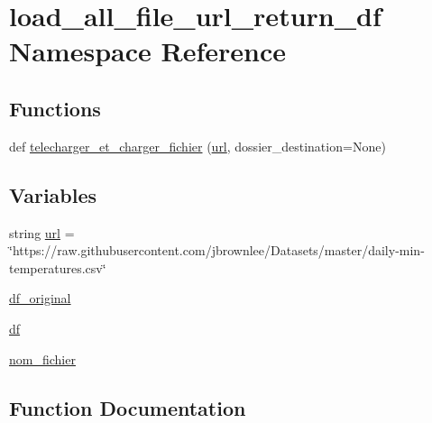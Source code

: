 \hypertarget{namespaceload__all__file__url__return__df}{}\section{load\+\_\+all\+\_\+file\+\_\+url\+\_\+return\+\_\+df Namespace Reference}
\label{namespaceload__all__file__url__return__df}
\subsection*{Functions}
\begin{DoxyCompactItemize}
\item 
def \hyperlink{namespaceload__all__file__url__return__df_a444d33e3bf671c50ce6cbe2a094d46f1}{telecharger\+\_\+et\+\_\+charger\+\_\+fichier} (\hyperlink{namespaceload__all__file__url__return__df_a244c87d4009157378422f3e580a8c001}{url}, dossier\+\_\+destination=None)
\end{DoxyCompactItemize}
\subsection*{Variables}
\begin{DoxyCompactItemize}
\item 
string \hyperlink{namespaceload__all__file__url__return__df_a244c87d4009157378422f3e580a8c001}{url} = \char`\"{}https\+://raw.\+githubusercontent.\+com/jbrownlee/Datasets/master/daily-\/min-\/temperatures.\+csv\char`\"{}
\item 
\hyperlink{namespaceload__all__file__url__return__df_a5dd7dfb0b58b151f2cc9123924b82bb7}{df\+\_\+original}
\item 
\hyperlink{namespaceload__all__file__url__return__df_a86fca53022cf6d2f9f7ea9d9396a5ad5}{df}
\item 
\hyperlink{namespaceload__all__file__url__return__df_a5a32746777f32baf5f824a720b64a1a7}{nom\+\_\+fichier}
\end{DoxyCompactItemize}


\subsection{Function Documentation}
\mbox{\label{namespaceload__all__file__url__return__df_a444d33e3bf671c50ce6cbe2a094d46f1}} 
